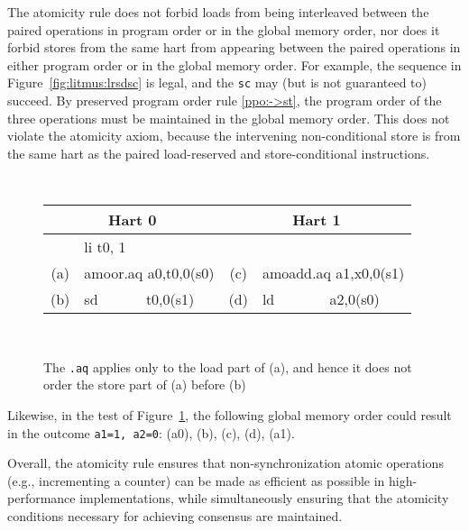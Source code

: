 The atomicity rule does not forbid loads from being interleaved between the paired operations in program order or in the global memory order, nor does it forbid stores from the same hart from appearing between the paired operations in either program order or in the global memory order.
For example, the sequence in Figure~\ref{fig:litmus:lrsdsc} is legal, and the {\tt sc} may (but is not guaranteed to) succeed.
By preserved program order rule \ref{ppo:->st}, the program order of the three operations must be maintained in the global memory order.  This does not violate the atomicity axiom, because the intervening non-conditional store is from the same hart as the paired load-reserved and store-conditional instructions.

\begin{figure}[h!]
  \centering
  {
    \setlength{\tabcolsep}{1mm}
    \tt\footnotesize
    \begin{tabular}{cl||cl}
    \multicolumn{2}{c}{Hart 0} & \multicolumn{2}{c}{Hart 1} \\
    \hline
          & li t0, 1              &     &             \\
      (a) & amoor.aq a0,t0,0(s0)  & (c) & amoadd.aq a1,x0,0(s1) \\
      (b) & sd~~~~~~ t0,0(s1)     & (d) & ld~~~~~~~ a2,0(s0) \\
    \end{tabular}
  }
  ~~
  \diagram
  \caption{The {\tt .aq} applies only to the load part of (a), and hence it does not order the store part of (a) before (b)}
  \label{fig:litmus:amoaq}
\end{figure}

Likewise, in the test of Figure~\ref{fig:litmus:amoaq}, the following global memory order could result in the outcome {\tt a1=1, a2=0}: (a0), (b), (c), (d), (a1).

Overall, the atomicity rule ensures that non-synchronization atomic operations (e.g., incrementing a counter) can be made as efficient as possible in high-performance implementations, while simultaneously ensuring that the atomicity conditions necessary for achieving consensus are maintained.


